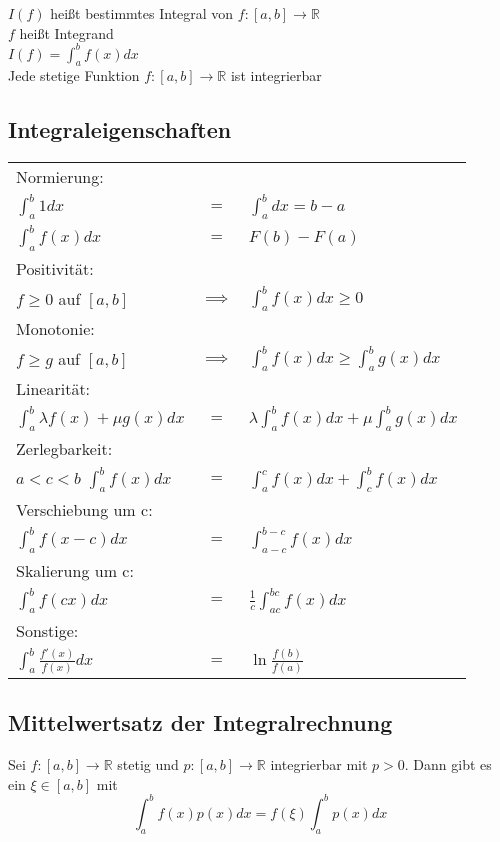 \documentclass[a4paper,9pt]{extarticle}
\newcommand{\intab}[1] {\int_{a}^{b} #1 dx}
\begin{document}
	$I(f)$ heißt bestimmtes Integral von $f : [a,b] → \mathbb{R}$ \\
	
	$f$ heißt Integrand \\
	
	$I(f) = \int_{a}^{b} f(x) dx$ \\
	
	Jede stetige Funktion $f : [a,b] → \mathbb{R}$ ist integrierbar
	
	\renewcommand{\arraystretch}{1.5}
	\subsection*{Integraleigenschaften}
	\begin{tabular}{lcl}
		Normierung: \\
		$\int_{a}^{b} 1 dx$ & $=$ & $\intab {} = b - a$ \\
		$\intab{f(x)}$ & $=$ & $F(b) - F(a)$ \\
		Positivität: \\
		$f ≥ 0$ auf $[a,b]$ & $\implies$ & $\intab {f(x)} ≥ 0$  \\
		Monotonie: \\
		$f ≥ g$ auf $[a,b]$ & $\implies$ & $\intab {f(x)} ≥ \intab {g(x)}$ \\
		Linearität: \\
		$\intab{\lambda f(x) + \mu g(x)}$ & $=$ & $\lambda \intab{f(x)} + \mu \intab{g(x)}$ \\
		Zerlegbarkeit: \\
		$a < c < b$ $\intab{f(x)}$ & $=$ & $\int_a^c f(x) dx + \int_c^b f(x) dx$ \\
		Verschiebung um c: \\
		$\intab{f(x - c)}$ & $=$ & $\int_{a-c}^{b-c} f(x) dx$ \\
		Skalierung um c: \\
		$\intab{f(cx)}$ & $=$ & $\frac{1}{c}\int_{ac}^{bc} f(x) dx$ \\
		Sonstige: \\
		$\intab{\frac{f'(x)}{f(x)}}$ & $=$ & $\ln \frac{f(b)}{f(a)}$ \\
	\end{tabular}
	\renewcommand{\arraystretch}{1}

	\subsection*{Mittelwertsatz der Integralrechnung}
	Sei $f : [a,b] → \mathbb{R}$ stetig und $p : [a,b] → \mathbb{R}$ integrierbar mit $p > 0$. Dann gibt es ein $\xi \in [a,b]$ mit 
	$$
		\intab{f(x)p(x)} = f(\xi) \intab{p(x)}
	$$
	
\end{document}
